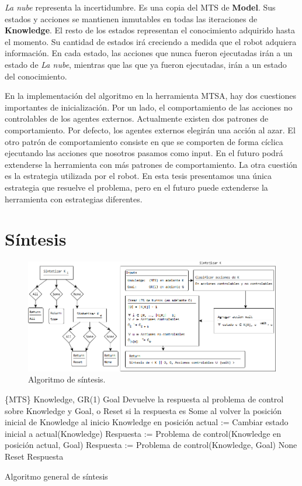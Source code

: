 \textit{La nube} representa la incertidumbre. Es una copia del MTS de \textbf{Model}. Sus estados y acciones se mantienen inmutables en todas las 
iteraciones de \textbf{Knowledge}. 
El resto de los estados representan el conocimiento adquirido hasta el momento. Su cantidad de estados irá creciendo a medida que el robot adquiera información. 
En cada estado, las acciones que nunca fueron ejecutadas irán a un estado de 
\textit{La nube}, mientras que las que ya fueron ejecutadas, irán a un estado 
del conocimiento.


En la implementación del algoritmo en la herramienta MTSA, hay dos cuestiones importantes de inicialización. 
Por un lado, el comportamiento de las acciones no controlables de los agentes externos. Actualmente existen dos patrones de comportamiento. 
Por defecto, los agentes externos elegirán una acción al azar. El otro patrón de comportamiento consiste en que se comporten de forma cíclica ejecutando 
las acciones que nosotros pasamos como input. En el futuro podrá extenderse la herramienta con más patrones de comportamiento. 
La otra cuestión es la estrategia utilizada por el robot. En esta tesis presentamos una única estrategia que resuelve el problema, pero en el futuro puede 
extenderse la herramienta con estrategias diferentes.

\section{Síntesis}

\begin{figure}[H]
  \centering
    \includegraphics[width=1.0\textwidth]{Imagenes/Algoritmo/Algoritmo_sintetizar.png}
  \caption{Algoritmo de síntesis.}
  \label{fig:Algoritmo_sintetizar}
\end{figure}

\begin{algorithm}
\begin{algorithmic}
\REQUIRE \{MTS\} Knowledge, GR(1) Goal
\ENSURE Devuelve la respuesta al problema de control sobre Knowledge y Goal, o Reset si la respuesta es Some al volver la posición inicial de Knowledge al inicio
\STATE Knowledge en posición actual := Cambiar estado inicial a actual(Knowledge)
\STATE Respuesta := Problema de control(Knowledge en posición actual, Goal)
\STATE Respuesta := Problema de control(Knowledge, Goal)
\RETURN None
\ELSE
\RETURN Reset
\ENDIF
\ELSE
\RETURN Respuesta
\ENDIF
\end{algorithmic}
\caption{Algoritmo general de síntesis}
\end{algorithm}

